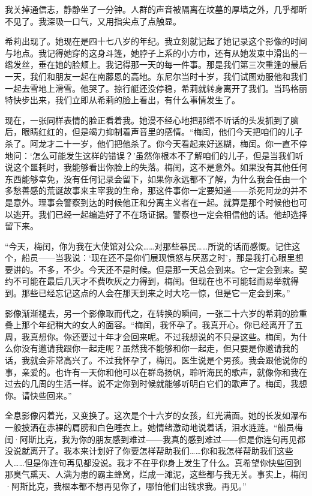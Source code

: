 \documentclass[AutoFakeBold=true]{book}
\begin{document}
\vspace*{1em}

我关掉通信志，静静坐了一分钟。人群的声音被隔离在坟墓的厚墙之外，几乎都昕不见了。我深吸一口气，又用指尖点了点触显。

希莉出现了。她现在是四十七八岁的年纪。我立刻就记起了她记录这个影像的时间与地点。我记得她穿的这身斗篷，她脖子上系的小方巾，还有从她发束中滑出的一绺发丝，垂在她的脸颊上。我记得那一天的每一件事。那是我们第三次重逢的最后一天，我们和朋友一起在南藤恩的高地。东尼尔当时十岁，我们试图劝服他和我们一起去雪地上滑雪。他哭了。掠行艇还没停稳，希莉就转身离开了我们。当玛格丽特快步出来，我们立即从希莉的脸上看出，有什么事情发生了。

现在，一张同样表情的脸正看着我。她漫不经心地把那绺不听话的头发抓到了脑后，眼睛红红的，但是竭力抑制着声音里的感情。``梅闰，他们今天把咱们的儿子杀了。阿龙才二十一岁，他们把他杀了。你今天看起来好迷糊，梅闰。你一直不停地问：`怎么可能发生这样的错误？'虽然你根本不了解咱们的儿子，但是当我们听说这个噩耗时，我能够看出你脸上的失落。梅闰，这不是意外。如果没有其他任何东西能够幸免，没有任何记录会留下，如果你永远都不了解，为什么我会任由一个多愁善感的荒诞故事来主宰我的生命，那这件事你一定要知道——杀死阿龙的并不是意外。理事会警察到达的时候他正和分离主义者在一起。就算是那个时候他也可以逃开。我们已经一起编造好了不在场证据。警察也一定会相信他的话。他却选择留下来。

``今天，梅闰，你为我在大使馆对公众……对那些暴民……所说的话而感慨。记住这个，船员——当我说：`现在还不是你们展现愤怒与厌恶之时'，那是我打心眼里想要讲的。不多，不少。今天还不是时候。但是那一天总会到来。它一定会到来。契约不可能在最后几天才不费吹灰之力得到，梅闰。但现在也不可能轻而易举就得到。那些已经忘记这点的人会在那天到来之时大吃一惊，但是它一定会到来。''

影像渐渐褪去，另一个影像取而代之，在转换的瞬间，一张二十六岁的希莉的脸重叠上那个年纪稍大的女人的面容。``梅闰，我怀孕了。我真开心。你已经离开了五周，我真想你。你还要过十年才会回来呢。不过我想说的不只是这些。梅闰，为什么你没有邀请我跟你一起走呢？虽然我不能够和你一起走，但只要是你邀请我的话，我就会非常高兴了。不过我怀孕了，梅闰。医生说是个男孩。我会跟他说你的事，亲爱的。也许有一天你和他可以在群岛扬帆，聆听海民的歌声，就像你和我在过去的几周的生活一样。说不定你到时候就能够听明白它们的歌声了。梅闰，我想你。请快些回来。''

全息影像闪着光，又变换了。这次是个十六岁的女孩，红光满面。她的长发如瀑布一般披洒在赤裸的肩膀和白色睡衣上。她情绪激动地说着话，泪水涟涟。``船员梅闰·阿斯比克，我为你的朋友感到难过——我真的感到难过——但是你连句再见都没说就离开了。我本来计划好了你要怎样帮助我们……你和我怎样帮助我们这些人……但是你连句再见都没说。我才不在乎你身上发生了什么。真希望你快些回到那臭气熏天、人满为患的霸主蜂窝，烂成一滩泥，这些都与我无关。事实上，梅闰·阿斯比克，我根本都不想再见你了，哪怕他们出钱求我。再见。''
\end{document}
